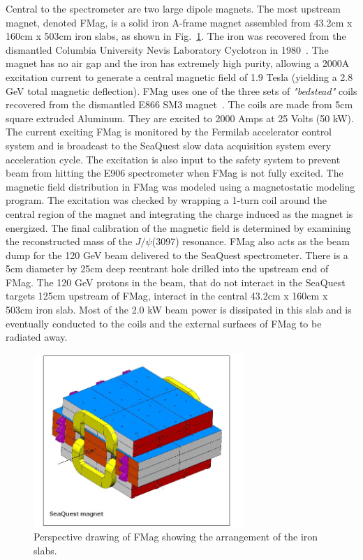 Central to the spectrometer are two large dipole magnets.  The most upstream magnet, denoted FMag, is a solid iron A-frame magnet assembled 
from 43.2cm x 160cm x 503cm iron slabs, as shown in Fig.~\ref{fig:FMag}. The iron was recovered from the dismantled Columbia University 
Nevis Laboratory Cyclotron in 1980~\cite{NevisCyclotron}.  The magnet has no air gap and the iron has extremely high purity, allowing a 
2000A excitation current to generate a central magnetic field of 1.9 Tesla (yielding a 2.8 GeV total magnetic deflection). FMag uses one 
of the three sets of \emph{"bedstead"} coils recovered from the dismantled E866 SM3 
magnet~\cite{PhysRevD.43.2815, PhysRevLett.64.2479, PhysRevLett.80.3715, Towell:2001nh}.  
The coils are made from 5cm square extruded Aluminum.  They are excited to 2000 Amps at 25 Volts (50 kW). 
 The current exciting FMag is monitored by the Fermilab accelerator control system and is broadcast to the SeaQuest slow data acquisition 
 system every acceleration cycle.  The excitation is also input to the safety system to prevent beam from hitting the E906 spectrometer when 
 FMag is not fully excited. The magnetic field distribution in FMag was modeled using a magnetostatic modeling program.  The excitation was 
 checked by wrapping a 1-turn coil around the central region of the magnet and integrating the charge induced as the magnet is energized.
 The final calibration of the magnetic field is determined by examining the reconstructed mass of the $J/\psi$(3097) resonance. FMag also acts 
 as the beam dump for the 120 GeV beam delivered to the SeaQuest spectrometer.  There is a 5cm diameter by 25cm deep reentrant hole drilled into 
 the upstream end of FMag.  The 120 GeV protons in the beam, that do not interact in the SeaQuest targets 125cm upstream of FMag, interact in the 
 central  43.2cm x 160cm x 503cm iron slab.  Most of the 2.0 kW beam power is dissipated in this slab and is eventually conducted to the coils and 
 the external surfaces of FMag to be radiated away.

\begin{figure}
	\centering
	\includegraphics[width=8cm]{figures/FMAG}
	\caption{Perspective drawing of FMag showing the arrangement of the iron slabs. \label{fig:FMag}}
\end{figure}

